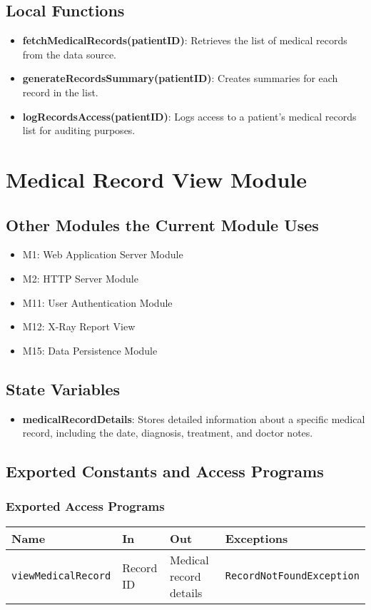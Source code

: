 \documentclass[12pt, titlepage]{article}
\begin{document}
\subsection{Local Functions}
\begin{itemize}
\item \textbf{fetchMedicalRecords(patientID)}: Retrieves the list of medical records from the data source.
\item \textbf{generateRecordsSummary(patientID)}: Creates summaries for each record in the list.
\item \textbf{logRecordsAccess(patientID)}: Logs access to a patient's medical records list for auditing purposes.
\end{itemize}
\section{Medical Record View Module}

\subsection{Other Modules the Current Module Uses}
\begin{itemize}
\item M1: Web Application Server Module
\item M2: HTTP Server Module
\item M11: User Authentication Module
\item M12: X-Ray Report View
\item M15: Data Persistence Module
\end{itemize}

\subsection{State Variables}
\begin{itemize}
\item \textbf{medicalRecordDetails}: Stores detailed information about a specific medical record, including the date, diagnosis, treatment, and doctor notes.
\end{itemize}

\subsection{Exported Constants and Access Programs}
\subsubsection{Exported Access Programs}
\begin{tabular}{|l|l|l|l|}
    \hline
    \textbf{Name} & \textbf{In} & \textbf{Out} & \textbf{Exceptions} \\
    \hline 
    \texttt{viewMedicalRecord} & Record ID & Medical record details & \texttt{RecordNotFoundException} \\
    \hline
\end{tabular}
\end{document}
